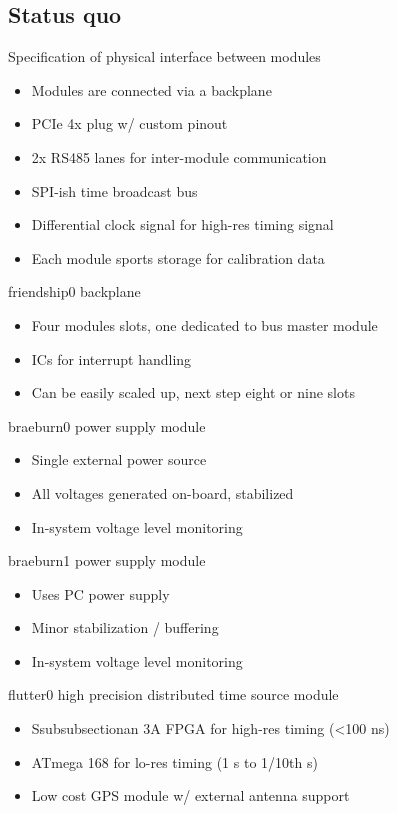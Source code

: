 \subsection{Status quo}
  \begin{frame}{Specification of physical interface between modules}
		\begin{itemize}
			\item Modules are connected via a backplane
			\item PCIe 4x plug w/ custom pinout
			\item 2x RS485 lanes for inter-module communication
			\item SPI-ish time broadcast bus
			\item Differential clock signal for high-res timing signal
			\item Each module sports storage for calibration data
		\end{itemize}
	\end{frame}
	\begin{frame}{friendship0 backplane}
		\begin{itemize}
			\item Four modules slots, one dedicated to bus master module
			\item ICs for interrupt handling
			\item Can be easily scaled up, next step eight or nine slots
		\end{itemize}
	\end{frame}
	\begin{frame}{braeburn0 power supply module}
		\begin{itemize}
			\item Single external power source
			\item All voltages generated on-board, stabilized
			\item In-system voltage level monitoring
		\end{itemize}
	\end{frame}
	\begin{frame}{braeburn1 power supply module}
		\begin{itemize}
			\item Uses PC power supply
			\item Minor stabilization / buffering
			\item In-system voltage level monitoring
		\end{itemize}
	\end{frame}
	\begin{frame}{flutter0 high precision distributed time source module}
		\begin{itemize}
			\item Ssubsubsectionan 3A FPGA for high-res timing (<100 ns)
			\item ATmega 168 for lo-res timing (1 s to 1/10th s)
			\item Low cost GPS module w/ external antenna support
		\end{itemize}
	\end{frame}
